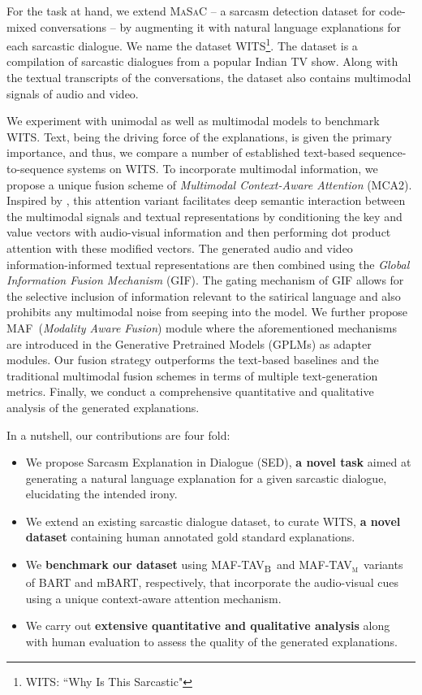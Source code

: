 \documentclass[11pt]{article}
\newcommand{\dataset}{\textsc{WITS}}
\newcommand{\model}{\textsc{MAF}}
\newcommand{\modelTAV}{\textsc{MAF-TAV\textsubscript{B}}}
\newcommand{\modelTAVm}{\textsc{MAF-TAV\textsubscript{m}}}
\newcommand{\task}{\textsc{SED}}
\begin{document}
For the task at hand, we extend \textsc{MaSaC} \cite{9442359} -- a sarcasm detection dataset for code-mixed conversations -- by augmenting it with natural language explanations for each sarcastic dialogue. We name the dataset \dataset\footnote{\dataset: ``Why Is This Sarcastic"}. The dataset is a compilation of sarcastic dialogues from a popular Indian TV show. Along with the textual transcripts of the conversations, the dataset also contains multimodal signals of audio and video.

We experiment with unimodal as well as multimodal models to benchmark \dataset. Text, being the driving force of the explanations, is given the primary importance, and thus, we compare a number of established text-based sequence-to-sequence systems on \dataset. To incorporate multimodal information, we propose a unique fusion scheme of \textit{Multimodal Context-Aware Attention} (MCA2). Inspired by  \citet{Yang_Li_Wong_Chao_Wang_Tu_2019}, this attention variant facilitates deep semantic interaction between the multimodal signals and textual representations by conditioning the key and value vectors with audio-visual information and then performing dot product attention with these modified vectors. The generated audio and video information-informed textual representations are then combined using the \textit{Global Information Fusion Mechanism} (GIF). The gating mechanism of {GIF} allows for the selective inclusion of information relevant to the satirical language and also prohibits any multimodal noise from seeping into the model. We further propose \model\ (\textit{Modality Aware Fusion}) module where the aforementioned mechanisms are introduced in the Generative Pretrained Models (GPLMs) as adapter modules. Our fusion strategy outperforms the text-based baselines and the traditional multimodal fusion schemes in terms of multiple text-generation metrics. Finally, we conduct a comprehensive quantitative and qualitative analysis of the generated explanations.

In a nutshell, our contributions are four fold:
\begin{itemize}[leftmargin=*,topsep=0pt]
\setlength{\itemsep}{0pt}
\setlength{\parskip}{0pt}
\setlength{\parsep}{0pt}
    \item We propose Sarcasm Explanation in Dialogue (\task), \textbf{a novel task} aimed at generating a natural language explanation for a given sarcastic dialogue, elucidating the intended irony.
    \item We extend an existing sarcastic dialogue dataset, to curate \dataset, \textbf{a novel dataset} containing human annotated gold standard explanations.
    \item We \textbf{benchmark our dataset} using \modelTAV\ and \modelTAVm\, variants of BART and mBART, respectively, that incorporate the audio-visual cues using a unique context-aware attention mechanism.
    \item We carry out \textbf{extensive quantitative and qualitative analysis} along with human evaluation to assess the quality of the generated explanations.
\end{itemize}
\end{document}
